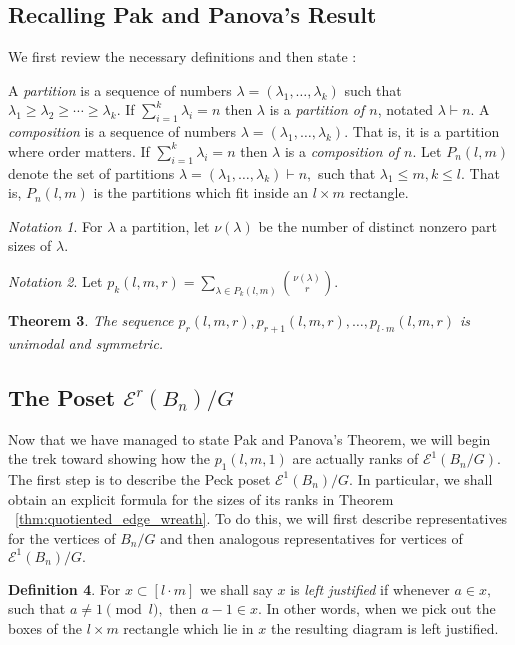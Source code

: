 \documentclass[10 pt]{amsart}
\theoremstyle{plain}
\newtheorem{thm}{Theorem}[section]
\theoremstyle{definition}
\newtheorem{defn}[thm]{Definition}
\theoremstyle{remark}
\newtheorem{note}[thm]{Notation}
\numberwithin{equation}{section}
\newcommand\ssec{\subsection}
\begin{document}
\ssec{Recalling Pak and Panova's Result}
We first review the necessary definitions and then state \cite[Theorem 1.1]{pak}:

A {\it partition} is a sequence of numbers $\lambda = (\lambda_1,\ldots, \lambda_k)$ such that $\lambda_1 \geq \lambda_2 \geq \cdots \geq \lambda_k.$ If $\sum_{i=1}^k \lambda_i = n$ then $\lambda$ is a {\it partition of $n$}, notated $\lambda \vdash n.$ A {\it composition} is a sequence of numbers $\lambda = (\lambda_1,\ldots, \lambda_k).$ That is, it is a partition where order matters. If $\sum_{i=1}^k \lambda_i = n$ then $\lambda$ is a {\it composition of $n$}. Let $P_n(l,m)$ denote the set of partitions $\lambda = (\lambda_1,\ldots, \lambda_k) \vdash n,$ such that $\lambda_1 \leq m,k \leq l.$ That is, $P_n(l,m)$ is the partitions which fit inside an $l \times m$ rectangle.

\begin{note}
\cite[Section 1]{pak} For $\lambda$ a partition, let $\nu(\lambda)$ be the number of distinct nonzero part sizes of $\lambda.$
\end{note}

\begin{note}
\cite[Section 1]{pak}
Let $p_k(l,m,r) = \sum_{\lambda \in P_k(l,m)} \binom{\nu(\lambda)}{r}.$
\end{note}

\begin{thm}
\label{thm:pak_thm}
\cite[Theorem 1.1]{pak}
The sequence $p_r(l,m,r), p_{r+1}(l,m,r),\ldots, p_{l\cdot m}(l,m,r)$ is unimodal and symmetric.
\end{thm}

\ssec{The Poset $\mathcal E^r(B_n)/G$}
Now that we have managed to state Pak and Panova's Theorem, we will begin the trek toward showing how the $p_1(l,m,1)$ are actually ranks of $\mathcal E^1(B_n/G).$ The first step is to describe the Peck poset $\mathcal E^1(B_n)/G.$ In particular, we shall obtain an explicit formula for the sizes of its ranks in Theorem ~\ref{thm:quotiented_edge_wreath}. To do this, we will first describe representatives for the vertices of $B_n/G$ and then analogous representatives for vertices of $\mathcal E^1(B_n)/G.$

\begin{defn}
For $x \subset [l \cdot m]$ we shall say $x$ is {\it left justified} if whenever $a \in x,$ such that $a \neq 1 \pmod l,$ then $a -1 \in x.$ In other words, when we pick out the boxes of the $l\times m$ rectangle which lie in $x$ the resulting diagram is left justified.
\end{defn}
\end{document}
